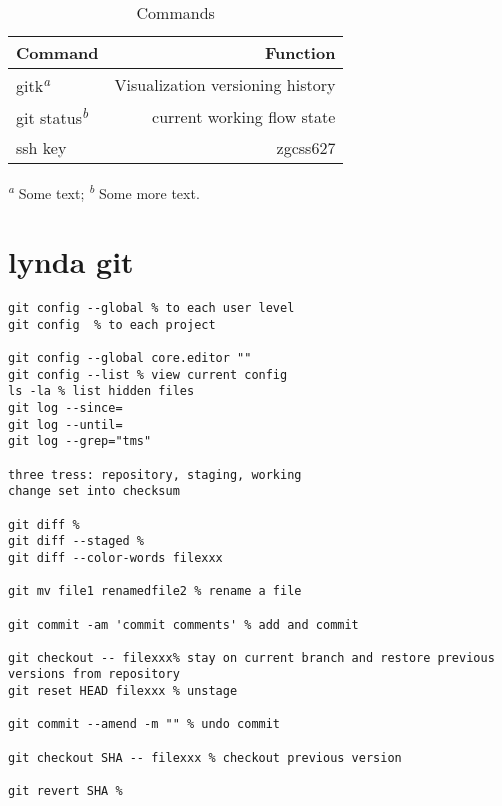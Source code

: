 \documentclass[12pt,letterpaper]{article}
\begin{document}
\begin{table}[htb]
  \caption{Commands}\label{tbl:notes}
  \centering
  \begin{tabular}{lr}
    \toprule
    Command                            & Function \\
    \midrule
    gitk\textsuperscript{\emph{a}}   & Visualization versioning history  \\
    git status\textsuperscript{\emph{b}} & current working flow state \\
    ssh key   & zgcss627\\

    \bottomrule
  \end{tabular}

  \textsuperscript{\emph{a}} Some text;
  \textsuperscript{\emph{b}} Some more text.
\end{table}

\section{lynda git}

\begin{lstlisting}
git config --global % to each user level
git config  % to each project

git config --global core.editor ""
git config --list % view current config
ls -la % list hidden files
git log --since=
git log --until=
git log --grep="tms"

three tress: repository, staging, working
change set into checksum

git diff %
git diff --staged %
git diff --color-words filexxx

git mv file1 renamedfile2 % rename a file

git commit -am 'commit comments' % add and commit

git checkout -- filexxx% stay on current branch and restore previous versions from repository
git reset HEAD filexxx % unstage 

git commit --amend -m "" % undo commit 

git checkout SHA -- filexxx % checkout previous version 

git revert SHA % 




\end{lstlisting}
\end{document}
